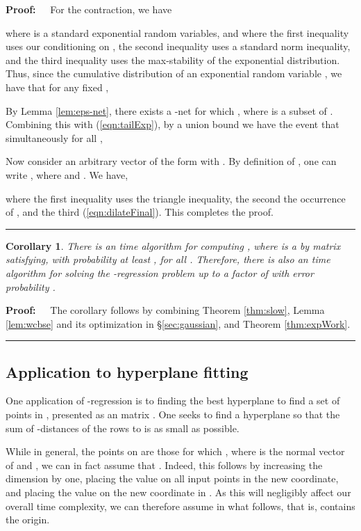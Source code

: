 \documentclass[11pt]{article}
\newtheorem{corollary}[theorem]{Corollary}
\newenvironment{proof}{\begin{trivlist} \item {\bf Proof:~~}}
  {\qed\end{trivlist}}
\def\qed{\hfill\rule{2mm}{2mm}}
\begin{document}
\begin{proof}
For the contraction, we have

where  is a standard exponential random variables, and 
where the first inequality uses our conditioning on , the second inequality uses a standard norm inequality, and
the third inequality uses the max-stability of the exponential distribution. Thus, since the cumulative distribution
of an exponential random variable , we have that for any fixed ,
 
By Lemma \ref{lem:eps-net}, there exists a -net  for which ,
where  is a subset of 
. Combining this with (\ref{eqn:tailExp}), by a union bound we have the event  that 
simultaneously for all 
, 

Now consider an arbitrary vector  of the form  
with . By definition of , one can
write , where  and . We have,

where the first inequality uses the triangle inequality, the second the occurrence of , and the third
(\ref{eqn:dilateFinal}). This completes the proof. 
\end{proof}
\begin{corollary}\label{cor:second}
There is an  time algorithm for computing , where 
 is a 
by  matrix satisfying, with probability at least , 
 for all . Therefore, there is also
an  time algorithm for solving the -regression problem
up to a factor of  with error probability . 
\end{corollary}
\begin{proof}
The corollary follows by combining Theorem \ref{thm:slow}, Lemma \ref{lem:wcbse} and its optimization 
in \S\ref{sec:gaussian}, and 
Theorem \ref{thm:expWork}. 
\end{proof}

\subsection{Application to hyperplane fitting}\label{sec:hyperplane}
One application of -regression is to finding the best hyperplane to find a 
set of  points in , presented as an  matrix  
\cite{bd09L1,bdb10,kk03,kk05,sw11,CDMMMW13}. 
One seeks
to find a hyperplane  so that the sum of -distances of the rows  to
 is as small as possible. 

While in general, the points on  are those  for which ,
where  is the normal vector of  and , we can in fact assume that 
. Indeed, this follows by increasing the dimension  by one, placing the value  on
all input points in the new coordinate, and placing the value  on the new coordinate in . As
this will negligibly affect our overall time complexity, we can therefore assume  in what
follows, that is,  contains the origin. 
\end{document}
